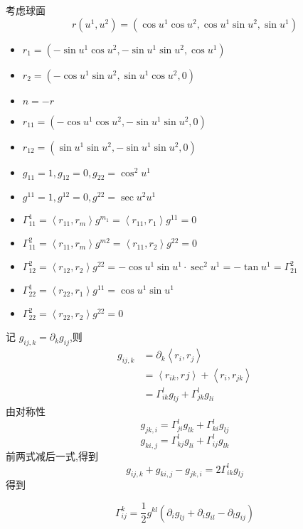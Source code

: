 \documentclass[../../古典微分几何.tex]{subfiles}
\begin{document}
\begin{example}
    考虑球面 \[
    r\left( u^{1},u^{2} \right)= \left( \cos u^{1}\cos u^{2},\cos u^{1}\sin u^{2},\sin u^{1} \right)  
    \] \begin{itemize}
        \item \(  r_1= \left( -\sin u^{1}\cos u^{2},-\sin u^{1}\sin u^{2},\cos u^{1} \right)   \)
        \item \(  r_2= \left( -\cos u^{1}\sin u^{2},\sin u^{1}\cos u^{2},0 \right)   \)
        \item \(  n = -r  \)  
        \item \(  r_{11}=  \left( -\cos u^{1}\cos u^{2},-\sin u^{1}\sin u^{2},0 \right)  \)
        \item \(  r_{12}= \left( \sin u^{1}\sin u^{2},-\sin u^{1}\sin u^{2},0 \right)   \)
        \item \(  g_{11}= 1,g_{12}= 0,g_{22}= \cos ^{2}u^{1}  \)
        \item \(  g^{11}= 1,g^{12}= 0,g^{22}= \sec u^{2}u^{1}  \)
        \item \(   \Gamma _{11}^{1}= \left<r_{11},r_{m} \right>g^{m_1}= \left<r_{11},r_1 \right>g^{11}= 0  \)
        \item \(   \Gamma _{11}^{2}= \left<r_{11},r_m \right>g^{m2}  = \left<r_{11},r_{2} \right>g^{22}= 0\)
        \item \(   \Gamma _{12}^{2}= \left<r_{12},r_2 \right>g^{22}= -\cos u^{1}\sin u^{1}\cdot \sec ^{2}u^{1}= -\tan u^{1}=  \Gamma _{21}^{2}  \)
        \item \(   \Gamma _{22}^{1}= \left<r_{22},r_1 \right>g^{11}= \cos u^{1}\sin u^{1}  \)
        \item \(   \Gamma _{22}^{2}= \left<r_{22},r_2 \right>g^{22}= 0  \)          
    \end{itemize}
    
\end{example}

\hspace*{\fill} 


记 \(  g_{ij,k}=  \partial _{k}g_{ij}  \),则 \[
\begin{aligned}
g_{ij,k}&=  \partial _{k}\left<r_{i},r_{j} \right> \\ 
 & = \left<r_{ik},r_{}j \right>+ \left<r_{i},r_{jk} \right>\\ 
  & =  \Gamma _{ik}^{l}g_{lj}+  \Gamma _{jk}^{l}g_{li}
\end{aligned}
\] 由对称性 \[
 g_{jk,i}=  \Gamma _{ji}^{l}g_{lk}+  \Gamma _{ki}^{l}g_{lj}
\]\[
g_{ki,j}=  \Gamma _{kj}^{l}g_{li}+  \Gamma _{ij}^{l}g_{lk}
\] 前两式减后一式,得到 \[
g_{ij,k}+ g_{ki,j}-g_{jk,i}= 2 \Gamma _{ik}^{l}g_{lj}
\]得到 
\begin{proposition}
    \[
 \Gamma _{ij}^{k}= \frac{1}{2}g^{kl}\left(  \partial _{i}g_{lj}+  \partial _{i}g_{il}- \partial _{l}g_{ij} \right) 
\]
\end{proposition}
\end{document}
